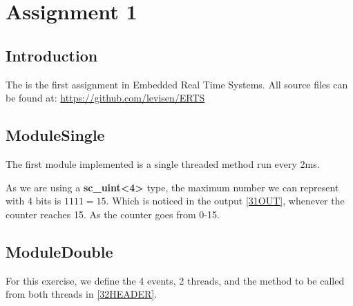 \documentclass[a4paper,12pt]{report}    %
\begin{document}
\lstset{style=output}

\tableofcontents
\pagestyle{ProjectReport}
\newpage
\lstlistoflistings
\newpage

\chapter{Assignment 1}
\section{Introduction}

The is the first assignment in Embedded Real Time Systems.
All source files can be found at: \url{https://github.com/levisen/ERTS}






\section{ModuleSingle}

The first module implemented is a single threaded method run every 2ms. 

\lstset{style=code}




As we are using a \textbf{sc\_uint<4>} type, the maximum number we can represent with 4 bits is \( 1111 = 15 \). Which is noticed in the output \ref{31OUT}, whenever the counter reaches 15. As the counter goes from 0-15.

\lstset{style=output}







\section{ModuleDouble}

For this exercise, we define the 4 events, 2 threads, and the method to be called from both threads in \ref{32HEADER}.

\lstset{style=code}

\end{document}

